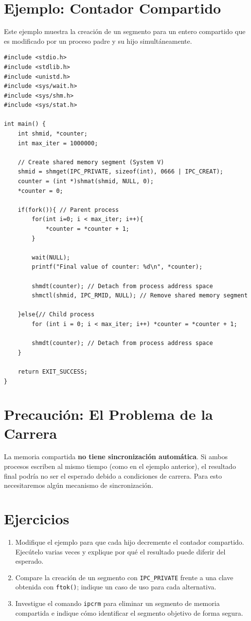 \documentclass[12pt,a4paper]{article}
\begin{document}
\newpage

\section{Ejemplo: Contador Compartido}
Este ejemplo muestra la creación de un segmento para un entero compartido que es modificado por un proceso padre y su hijo simultáneamente.

\begin{lstlisting}
#include <stdio.h>
#include <stdlib.h>
#include <unistd.h>
#include <sys/wait.h>
#include <sys/shm.h>
#include <sys/stat.h>

int main() {
    int shmid, *counter;
    int max_iter = 1000000;

    // Create shared memory segment (System V)
    shmid = shmget(IPC_PRIVATE, sizeof(int), 0666 | IPC_CREAT);
    counter = (int *)shmat(shmid, NULL, 0);
    *counter = 0;

    if(fork()){ // Parent process
        for(int i=0; i < max_iter; i++){
            *counter = *counter + 1;
        } 

        wait(NULL);
        printf("Final value of counter: %d\n", *counter);

        shmdt(counter); // Detach from process address space
        shmctl(shmid, IPC_RMID, NULL); // Remove shared memory segment
        
    }else{// Child process
        for (int i = 0; i < max_iter; i++) *counter = *counter + 1;

        shmdt(counter); // Detach from process address space
    }

    return EXIT_SUCCESS;
}
\end{lstlisting}

\section{Precaución: El Problema de la Carrera}
La memoria compartida \textbf{no tiene sincronización automática}. Si ambos procesos escriben al mismo tiempo (como en el ejemplo anterior), el resultado final podría no ser el esperado debido a condiciones de carrera. Para esto necesitaremos algún mecanismo de sincronización.

\section{Ejercicios}
\begin{enumerate}
    \item Modifique el ejemplo para que cada hijo decremente el contador compartido. Ejecútelo varias veces y explique por qué el resultado puede diferir del esperado.
    \item Compare la creación de un segmento con \texttt{IPC\_PRIVATE} frente a una clave obtenida con \texttt{ftok()}; indique un caso de uso para cada alternativa.
    \item Investigue el comando \texttt{ipcrm} para eliminar un segmento de memoria compartida e indique cómo identificar el segmento objetivo de forma segura.
\end{enumerate}
\end{document}
